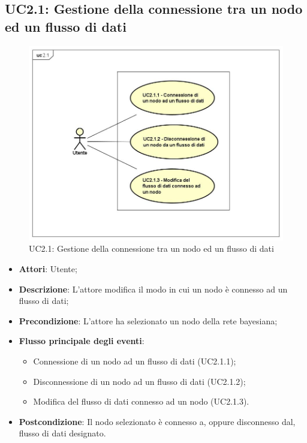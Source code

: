 \subsection{UC2.1: Gestione della connessione tra un nodo ed un flusso di dati}
\begin{figure} [H]
	\centering
	\includegraphics[scale=0.45]{Img/UC2-1}
	\caption{UC2.1: Gestione della connessione tra un nodo ed un flusso di dati}\label{}
\end{figure}
\begin{itemize}
	\item \textbf{Attori}: Utente;
	\item \textbf{Descrizione}: L'attore modifica il modo in cui un nodo è connesso ad un flusso di dati;
	\item \textbf{Precondizione}: L'attore ha selezionato un nodo della rete bayesiana;
	\item \textbf{Flusso principale degli eventi}:
	\begin{itemize}
		\item Connessione di un nodo ad un flusso di dati (UC2.1.1);
		\item Disconnessione di un nodo ad un flusso di dati (UC2.1.2);
		\item Modifica del flusso di dati connesso ad un nodo (UC2.1.3).
	\end{itemize}
	\item \textbf{Postcondizione}: Il nodo selezionato è connesso a, oppure disconnesso dal, flusso di dati designato.
\end{itemize}

